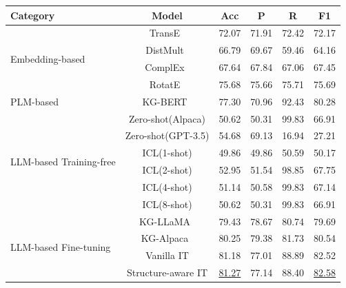 \documentclass[12pt,a4paper]{article}
\begin{document}
\begin{table}
    \centering
    \begin{tabular}{l|c|>{\columncolor{light-gray}}c|cc|>{\columncolor{light-gray}}c|}
        \toprule
        \textbf{Category} & \textbf{Model}                      & \textbf{Acc}      & \textbf{P} & \textbf{R} & \textbf{F1}       \\ \midrule

        \multirow{4}{*}{Embedding-based}
        & TransE~\cite{bordes2013translating} & 72.07             & 71.91      & 72.42      & 72.17             \\
        & DistMult~\cite{yang2014embedding}   & 66.79             & 69.67      & 59.46      & 64.16             \\
        & ComplEx~\cite{trouillon2016complex} & 67.64             & 67.84      & 67.06      & 67.45             \\
        & RotatE~\cite{sun2019rotate}         & 75.68             & 75.66      & 75.71      & 75.69             \\
        \midrule

        \multirow{1}{*}{PLM-based}
        & KG-BERT~\cite{yao2019kgbert}        & 77.30             & 70.96      & 92.43      & 80.28             \\
        \midrule

        \multirow{6}{*}{LLM-based Training-free}
        & Zero-shot(Alpaca)                   & 50.62             & 50.31      & 99.83      & 66.91             \\
        & Zero-shot(GPT-3.5)                  & 54.68             & 69.13      & 16.94      & 27.21             \\
        & ICL(1-shot)                         & 49.86             & 49.86      & 50.59      & 50.17             \\
        & ICL(2-shot)                         & 52.95             & 51.54      & 98.85      & 67.75             \\
        & ICL(4-shot)                         & 51.14             & 50.58      & 99.83      & 67.14             \\
        & ICL(8-shot)                         & 50.62             & 50.31      & 99.83      & 66.91             \\
        \midrule

        \multirow{4}{*}{LLM-based Fine-tuning}
        & KG-LLaMA~\cite{yao2023exploring}    & 79.43             & 78.67      & 80.74      & 79.69             \\
        & KG-Alpaca~\cite{yao2023exploring}   & 80.25             & 79.38      & 81.73      & 80.54             \\
        & Vanilla IT                          & 81.18             & 77.01      & 88.89      & 82.52             \\
        & Structure-aware IT                  & \underline{81.27} & 77.14      & 88.40      & \underline{82.58} \\
        \midrule


\end{tabular}
\end{table}
\end{document}
